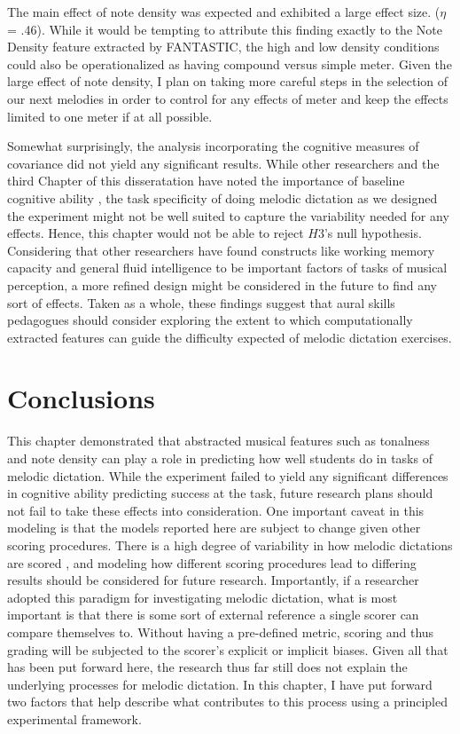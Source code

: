 \documentclass[12pt,]{book}
\begin{document}
The main effect of note density was expected and exhibited a large effect size. (\(\eta\) = .46).
While it would be tempting to attribute this finding exactly to the Note Density feature extracted by FANTASTIC, the high and low density conditions could also be operationalized as having compound versus simple meter.
Given the large effect of note density, I plan on taking more careful steps in the selection of our next melodies in order to control for any effects of meter and keep the effects limited to one meter if at all possible.

Somewhat surprisingly, the analysis incorporating the cognitive measures of covariance did not yield any significant results.
While other researchers and the third Chapter of this disseratation have noted the importance of baseline cognitive ability \citep{schellenbergMusicCognitiveAbilities2013}, the task specificity of doing melodic dictation as we designed the experiment might not be well suited to capture the variability needed for any effects.
Hence, this chapter would not be able to reject \(H3\)'s null hypothesis.
Considering that other researchers have found constructs like working memory capacity and general fluid intelligence to be important factors of tasks of musical perception, a more refined design might be considered in the future to find any sort of effects.
Taken as a whole, these findings suggest that aural skills pedagogues should consider exploring the extent to which computationally extracted features can guide the difficulty expected of melodic dictation exercises.

\hypertarget{conclusions-3}{%
\section{Conclusions}\label{conclusions-3}}

This chapter demonstrated that abstracted musical features such as tonalness and note density can play a role in predicting how well students do in tasks of melodic dictation.
While the experiment failed to yield any significant differences in cognitive ability predicting success at the task, future research plans should not fail to take these effects into consideration.
One important caveat in this modeling is that the models reported here are subject to change given other scoring procedures.
There is a high degree of variability in how melodic dictations are scored \citep{gillespieMelodicDictationScoring2001}, and modeling how different scoring procedures lead to differing results should be considered for future research.
Importantly, if a researcher adopted this paradigm for investigating melodic dictation, what is most important is that there is some sort of external reference a single scorer can compare themselves to.
Without having a pre-defined metric, scoring and thus grading will be subjected to the scorer's explicit or implicit biases.
Given all that has been put forward here, the research thus far still does not explain the underlying processes for melodic dictation.
In this chapter, I have put forward two factors that help describe what contributes to this process using a principled experimental framework.
\end{document}
